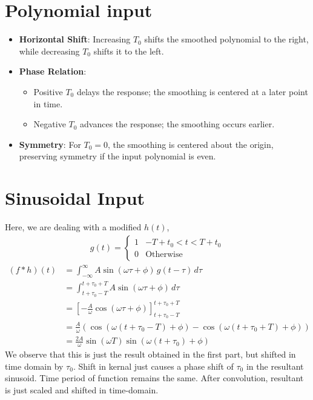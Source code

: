 \documentclass[12pt,a4paper]{report}
\newcommand{\brak}[1]{\ensuremath{\left(#1\right)}}
\providecommand{\sbrak}[1]{\ensuremath{{}\left[#1\right]}}
\providecommand{\brak}[1]{\ensuremath{\left(#1\right)}}
\begin{document}
\section{Polynomial input}

\begin{itemize}
    \item \textbf{Horizontal Shift}: Increasing $T_0$ shifts the smoothed polynomial to the right, while decreasing $T_0$ shifts it to the left.

    \item \textbf{Phase Relation}: 
    \begin{itemize}
        \item Positive $T_0$ delays the response; the smoothing is centered at a later point in time.
        \item Negative $T_0$ advances the response; the smoothing occurs earlier.
    \end{itemize}

    \item \textbf{Symmetry}: For $T_0 = 0$, the smoothing is centered about the origin, preserving symmetry if the input polynomial is even.
\end{itemize}
\section{Sinusoidal Input}
Here, we are dealing with a modified $h\brak{t}$,
\begin{align*}
    g\brak{t} = \begin{cases}
        1 & -T + t_0 < t < T + t_0\\
        0 & \text{Otherwise}
    \end{cases}
\end{align*}
\begin{align*}
(f \ast h)\brak{t} &= \int_{-\infty}^\infty A\sin\brak{\omega \tau + \phi} \, g\brak{t - \tau} \, d\tau \\
&= \int_{t+\tau_0-T}^{t + \tau_0+T} A\sin\brak{\omega \tau + \phi} \, d\tau \\
&= \sbrak{-\frac{A}{\omega} \cos\brak{\omega \tau + \phi}}_{t+ \tau_0-T}^{t+ \tau_0+T} \\
&= \frac{A}{\omega} \brak{\cos\brak{\omega (t+ \tau_0 - T) + \phi} - \cos\brak{\omega (t+ \tau_0 + T) + \phi}} \\
&= \frac{2A}{\omega} \sin\brak{\omega T} \sin\brak{\omega (t+ \tau_0) + \phi}
\end{align*}
We observe that this is just the result obtained in the first part, but shifted in time domain by $\tau_0$. Shift in kernal just causes a phase shift of $\tau_0$ in the resultant sinusoid. Time period of function remains the same. After convolution, resultant is just scaled and shifted in time-domain.
\end{document}
